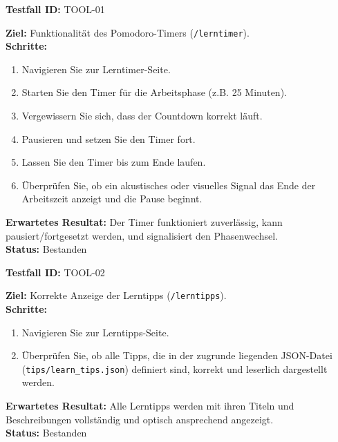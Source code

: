 \documentclass[11pt, a4paper]{article}
\newenvironment{testcase}[1]{%
    \par\vspace{1em}\noindent\begin{minipage}{\linewidth}
    \textbf{Testfall ID:} #1 \\
    \vspace{0.2em}
}{\end{minipage}\par\vspace{1em}}
\begin{document}
\begin{testcase}{TOOL-01}
    \textbf{Ziel:} Funktionalität des Pomodoro-Timers (\texttt{/lerntimer}).\\
    \textbf{Schritte:}
    \begin{enumerate}[label=\arabic*.]
        \item Navigieren Sie zur Lerntimer-Seite.
        \item Starten Sie den Timer für die Arbeitsphase (z.B. 25 Minuten).
        \item Vergewissern Sie sich, dass der Countdown korrekt läuft.
        \item Pausieren und setzen Sie den Timer fort.
        \item Lassen Sie den Timer bis zum Ende laufen.
        \item Überprüfen Sie, ob ein akustisches oder visuelles Signal das Ende der Arbeitszeit anzeigt und die Pause beginnt.
    \end{enumerate}
    \textbf{Erwartetes Resultat:} Der Timer funktioniert zuverlässig, kann pausiert/fortgesetzt werden, und signalisiert den Phasenwechsel.\\
    \vspace{0.5em}\textbf{Status:} \textcolor{passcolor}{Bestanden}
\end{testcase}

\begin{testcase}{TOOL-02}
    \textbf{Ziel:} Korrekte Anzeige der Lerntipps (\texttt{/lerntipps}).\\
    \textbf{Schritte:}
    \begin{enumerate}[label=\arabic*.]
        \item Navigieren Sie zur Lerntipps-Seite.
        \item Überprüfen Sie, ob alle Tipps, die in der zugrunde liegenden JSON-Datei (\texttt{tips/learn\_tips.json}) definiert sind, korrekt und leserlich dargestellt werden.
    \end{enumerate}
    \textbf{Erwartetes Resultat:} Alle Lerntipps werden mit ihren Titeln und Beschreibungen vollständig und optisch ansprechend angezeigt.\\
    \vspace{0.5em}\textbf{Status:} \textcolor{passcolor}{Bestanden}
\end{testcase}
\end{document}
